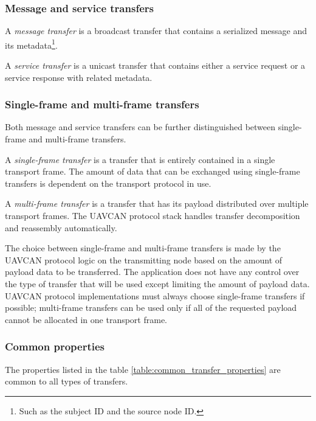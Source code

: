 \subsubsection{Message and service transfers}

A \emph{message transfer} is a broadcast transfer that contains a serialized message and its
metadata\footnote{Such as the subject ID and the source node ID.}.

A \emph{service transfer} is a unicast transfer that contains either a service request or a service response
with related metadata.

\subsubsection{Single-frame and multi-frame transfers}

Both message and service transfers can be further distinguished between single-frame and multi-frame transfers.

A \emph{single-frame transfer} is a transfer that is entirely contained in a single transport frame.
The amount of data that can be exchanged using single-frame transfers is dependent on the transport protocol in use.

A \emph{multi-frame transfer} is a transfer that has its payload distributed over multiple transport frames.
The UAVCAN protocol stack handles transfer decomposition and reassembly automatically.

The choice between single-frame and multi-frame transfers is made by the UAVCAN protocol logic on
the transmitting node based on the amount of payload data to be transferred.
The application does not have any control over the type of transfer that will be used
except limiting the amount of payload data.
UAVCAN protocol implementations must always choose single-frame transfers if possible;
multi-frame transfers can be used only if all of the requested payload cannot be allocated in one transport frame.

\subsubsection{Common properties}

The properties listed in the table \ref{table:common_transfer_properties} are common to all types of transfers.

